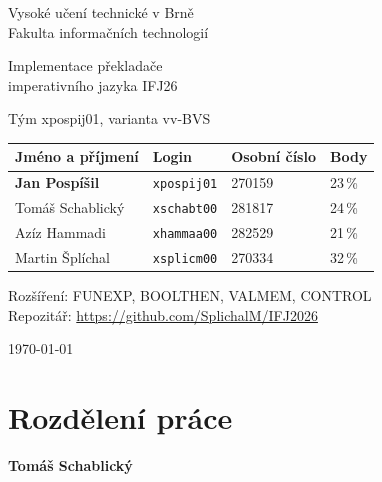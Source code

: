 \documentclass[11pt,a4paper]{article}
\begin{document}
\begin{titlepage}
  \centering
  {\Large Vysoké učení technické v Brně\\ Fakulta informačních technologií\par}
  \vspace{4cm}
  {\Huge Implementace překladače\\[0.3em] imperativního jazyka IFJ26\par}
  \vspace{1cm}
  {\Large Tým xpospij01, varianta vv-BVS\par}
  \vspace{2cm}

  \begin{tabular}{@{}llll@{}}
    \toprule
    Jméno a příjmení & Login & Osobní číslo & Body \\
    \midrule
    \textbf{Jan Pospíšil} & \texttt{xpospij01} & 270159 & 23\,\% \\
    Tomáš Schablický          & \texttt{xschabt00} & 281817 & 24\,\% \\
    Azíz Hammadi              & \texttt{xhammaa00} & 282529 & 21\,\% \\
    Martin Šplíchal            & \texttt{xsplicm00} & 270334 & 32\,\% \\
    \bottomrule
  \end{tabular}

  \vspace{1.5cm}
  Rozšíření: FUNEXP, BOOLTHEN, VALMEM, CONTROL\\[0.5em]
  Repozitář: \url{https://github.com/SplichalM/IFJ2026}

  \vfill
  {\large \today\par}
\end{titlepage}

\tableofcontents
\newpage

\section{Rozdělení práce}

\textbf{Tomáš Schablický}
\end{document}
